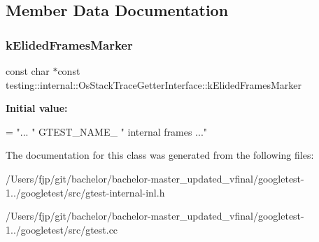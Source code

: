 \subsection{Member Data Documentation}
\mbox{\label{classtesting_1_1internal_1_1_os_stack_trace_getter_interface_a669c49ce9ae05935e70bddb35a81ceb8}} 
\subsubsection{\texorpdfstring{k\+Elided\+Frames\+Marker}{kElidedFramesMarker}}
{\footnotesize\ttfamily const char $\ast$const testing\+::internal\+::\+Os\+Stack\+Trace\+Getter\+Interface\+::k\+Elided\+Frames\+Marker\hspace{0.3cm}{\ttfamily [static]}}

{\bfseries Initial value\+:}
\begin{DoxyCode}
=
    \textcolor{stringliteral}{"... "} GTEST\_NAME\_ \textcolor{stringliteral}{" internal frames ..."}
\end{DoxyCode}


The documentation for this class was generated from the following files\+:\begin{DoxyCompactItemize}
\item 
/\+Users/fjp/git/bachelor/bachelor-\/master\+\_\+updated\+\_\+vfinal/googletest-\/1../googletest/src/gtest-\/internal-\/inl.\+h\item 
/\+Users/fjp/git/bachelor/bachelor-\/master\+\_\+updated\+\_\+vfinal/googletest-\/1../googletest/src/gtest.\+cc\end{DoxyCompactItemize}
